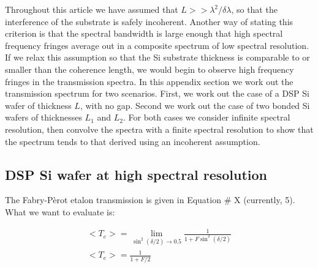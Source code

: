 \documentclass[osajnl,preprint,showpacs,superscriptaddress,12pt]{revtex4-1} %
\begin{document}
Throughout this article we have assumed that $L >> \lambda^2 / \delta \lambda$, so that the interference of the substrate is safely incoherent.  Another way of stating this criterion is that the spectral bandwidth is large enough that high spectral frequency fringes average out in a composite spectrum of low spectral resolution.  If we relax this assumption so that the Si substrate thickness is comparable to or smaller than the coherence length, we would begin to observe high frequency fringes in the transmission spectra.  In this appendix section we work out the transmission spectrum for two scenarios.  First, we work out the case of a DSP Si wafer of thickness $L$, with no gap.  Second we work out the case of two bonded Si wafers of thicknesses $L_1$ and $L_2$.  For both cases we consider infinite spectral resolution, then convolve the spectra with a finite spectral resolution to show that the spectrum tends to that derived using an incoherent assumption.  

\subsection{DSP Si wafer at high spectral resolution}
The Fabry-P\`erot etalon transmission is given in Equation \# X (currently, 5).  What we want to evaluate is:
  
\begin{eqnarray}
 <T_e> = \lim_{\sin^2(\delta/2) \to 0.5} \frac{1}{1+F\sin^2(\delta/2)} \\
 <T_e> = \frac{1}{1+F/2}
\end{eqnarray}









\end{document}
